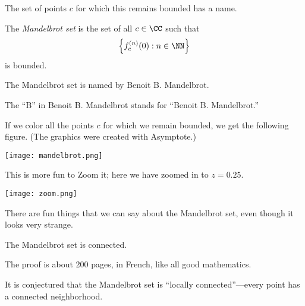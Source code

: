 \documentclass[../notes.tex]{subfiles}
\begin{document}
The set of points $c$ for which this remains bounded has a name.
\begin{definition}
	The \textit{Mandelbrot set} is the set of all $c\in\CC$ such that
	\[\left\{f_c^{(n)}(0):n\in\NN\right\}\]
	is bounded.
\end{definition}
\begin{remark}
	The Mandelbrot set is named by Benoit B. Mandelbrot.
\end{remark}
\begin{remark}
	The ``B'' in Benoit B. Mandelbrot stands for ``Benoit B. Mandelbrot.''
\end{remark}
If we color all the points $c$ for which we remain bounded, we get the following figure. (The graphics were created with Asymptote.)
\begin{center}
	\texttt{[image: mandelbrot.png]}
\end{center}
This is more fun to Zoom it; here we have zoomed in to $z=0.25$.
\begin{center}
	\texttt{[image: zoom.png]}
\end{center}
There are fun things that we can say about the Mandelbrot set, even though it looks very strange.
\begin{theorem}
	The Mandelbrot set is connected.
\end{theorem}
The proof is about 200 pages, in French, like all good mathematics.
\begin{remark}
	It is conjectured that the Mandelbrot set is ``locally connected''---every point has a connected neighborhood.
\end{remark}
\end{document}
